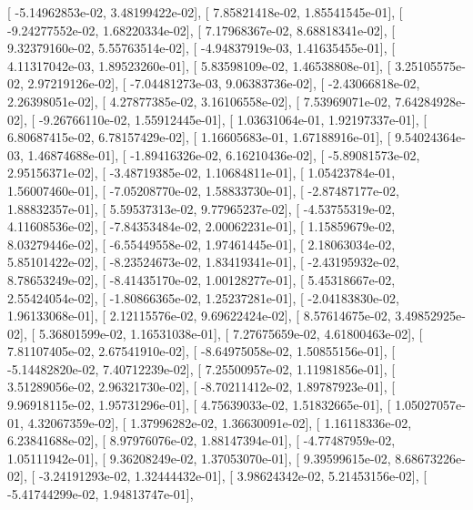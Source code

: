 \documentclass{article}
\begin{document}
       [ -5.14962853e-02,   3.48199422e-02],
       [  7.85821418e-02,   1.85541545e-01],
       [ -9.24277552e-02,   1.68220334e-02],
       [  7.17968367e-02,   8.68818341e-02],
       [  9.32379160e-02,   5.55763514e-02],
       [ -4.94837919e-03,   1.41635455e-01],
       [  4.11317042e-03,   1.89523260e-01],
       [  5.83598109e-02,   1.46538808e-01],
       [  3.25105575e-02,   2.97219126e-02],
       [ -7.04481273e-03,   9.06383736e-02],
       [ -2.43066818e-02,   2.26398051e-02],
       [  4.27877385e-02,   3.16106558e-02],
       [  7.53969071e-02,   7.64284928e-02],
       [ -9.26766110e-02,   1.55912445e-01],
       [  1.03631064e-01,   1.92197337e-01],
       [  6.80687415e-02,   6.78157429e-02],
       [  1.16605683e-01,   1.67188916e-01],
       [  9.54024364e-03,   1.46874688e-01],
       [ -1.89416326e-02,   6.16210436e-02],
       [ -5.89081573e-02,   2.95156371e-02],
       [ -3.48719385e-02,   1.10684811e-01],
       [  1.05423784e-01,   1.56007460e-01],
       [ -7.05208770e-02,   1.58833730e-01],
       [ -2.87487177e-02,   1.88832357e-01],
       [  5.59537313e-02,   9.77965237e-02],
       [ -4.53755319e-02,   4.11608536e-02],
       [ -7.84353484e-02,   2.00062231e-01],
       [  1.15859679e-02,   8.03279446e-02],
       [ -6.55449558e-02,   1.97461445e-01],
       [  2.18063034e-02,   5.85101422e-02],
       [ -8.23524673e-02,   1.83419341e-01],
       [ -2.43195932e-02,   8.78653249e-02],
       [ -8.41435170e-02,   1.00128277e-01],
       [  5.45318667e-02,   2.55424054e-02],
       [ -1.80866365e-02,   1.25237281e-01],
       [ -2.04183830e-02,   1.96133068e-01],
       [  2.12115576e-02,   9.69622424e-02],
       [  8.57614675e-02,   3.49852925e-02],
       [  5.36801599e-02,   1.16531038e-01],
       [  7.27675659e-02,   4.61800463e-02],
       [  7.81107405e-02,   2.67541910e-02],
       [ -8.64975058e-02,   1.50855156e-01],
       [ -5.14482820e-02,   7.40712239e-02],
       [  7.25500957e-02,   1.11981856e-01],
       [  3.51289056e-02,   2.96321730e-02],
       [ -8.70211412e-02,   1.89787923e-01],
       [  9.96918115e-02,   1.95731296e-01],
       [  4.75639033e-02,   1.51832665e-01],
       [  1.05027057e-01,   4.32067359e-02],
       [  1.37996282e-02,   1.36630091e-02],
       [  1.16118336e-02,   6.23841688e-02],
       [  8.97976076e-02,   1.88147394e-01],
       [ -4.77487959e-02,   1.05111942e-01],
       [  9.36208249e-02,   1.37053070e-01],
       [  9.39599615e-02,   8.68673226e-02],
       [ -3.24191293e-02,   1.32444432e-01],
       [  3.98624342e-02,   5.21453156e-02],
       [ -5.41744299e-02,   1.94813747e-01],
\end{document}
